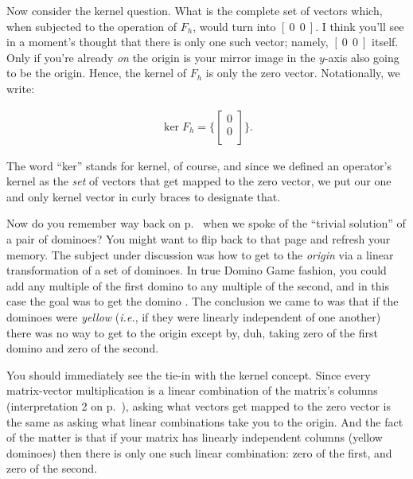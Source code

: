 Now consider the kernel question. What is the complete set of vectors which,
when subjected to the operation of $F_{h}$, would turn into $[\ 0\ \ 0\ ]$. I
think you'll see in a moment's thought that there is only one such vector;
namely, $[\ 0\ \ 0\ ]$ itself. Only if you're already \textit{on} the origin is
your mirror image in the $y$-axis also going to be the origin. Hence, the
kernel of $F_{h}$ is only the zero vector. Notationally, we write:

\vspace{-.15in}
\begin{align*}
\ker F_{h} = \{ 
\begin{bmatrix}
0 \\ 0 \\
\end{bmatrix}
\}.
\end{align*}
\vspace{-.15in}


The word ``ker'' stands for kernel, of course, and since we defined an
operator's kernel as the \textit{set} of vectors that get mapped to the zero
vector, we put our one and only kernel vector in curly braces to designate
that.

Now do you remember way back on p.~\pageref{trivialSolution} when we spoke of
the ``trivial solution'' of a pair of dominoes? You might want to flip back to
that page and refresh your memory. The subject under discussion was how to get
to the \textit{origin} via a linear transformation of a set of dominoes. In
true Domino Game fashion, you could add any multiple of the first domino to any
multiple of the second, and in this case the goal was to get the domino
.
The conclusion we came to was that if the dominoes were \textit{yellow}
(\textit{i.e.}, if they were linearly independent of one another) there was no
way to get to the origin except by, duh, taking zero of the first domino and
zero of the second.

You should immediately see the tie-in with the kernel concept. Since every
matrix-vector multiplication is a linear combination of the matrix's columns
(interpretation 2 on p.~\pageref{twoInterpretations}), asking what vectors get
mapped to the zero vector is the same as asking what linear combinations take
you to the origin. And the fact of the matter is that if your matrix has
linearly independent columns (yellow dominoes) then there is only one such
linear combination: zero of the first, and zero of the second.

